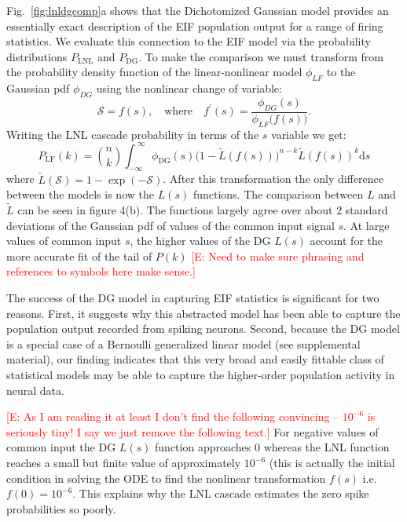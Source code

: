 \documentclass[%
 reprint,
 twocolumn,
 amsmath,amssymb,
 aps,
floatfix,
]{revtex4}
\newcommand{\dd}{\mathrm{d}}
\newcommand{\Ecomment}[1]{\textcolor{red}{[E: #1]}}
\begin{document}
Fig.~\ref{fig:lnldgcomp}a shows that the Dichotomized Gaussian model provides an essentially exact description of the EIF population output for a range of firing statistics.
We evaluate this connection to the EIF model via the probability distributions $P_{\text{LNL}}$ and $P_{\text{DG}}$. To make the comparison we must transform from the probability density function of the linear-nonlinear model $\phi_{LF}$ to the Gaussian pdf $\phi_{DG}$ using the nonlinear change of variable:
\begin{equation}
\mathcal{S} = f(s),\quad\text{where}\quad f^\prime(s) = \frac{\phi_{DG}(s)}{\phi_{LF}\big(f(s)\big)}.
\end{equation}
Writing the LNL cascade probability in terms of the $s$ variable we get:
\begin{equation}
P_{\text{LF}}(k) = \binom{n}{k}\!\!\int_{-\infty}^{~\infty} \phi_{\text{DG}}(s) \big(1-\tilde{L}(f(s))\big)^{n-k} \tilde{L}(f(s))^{k} \dd s
\end{equation}
where $\tilde{L}(\mathcal{S}) = 1-\exp(-\mathcal{S})$. After this transformation the only difference between the models is now the $L(s)$ functions. The comparison between $L$ and $\tilde{L}$ can be seen in figure 4(b). The functions largely agree over about $2$ standard deviations of the Gaussian pdf of values of the common input signal $s$.  At large values of common input $s$, the higher values of the DG $L(s)$ account for the more accurate fit of the tail of $P(k)$ \Ecomment{Need to make sure phrasing and references to symbols here make sense.}  

The success of the DG model in capturing EIF statistics is significant for two reasons.  First, it suggests why this abstracted model has been able to capture the population output recorded from spiking neurons.  Second, because the DG model is a special case of a Bernoulli generalized linear model (see supplemental material), our finding indicates that this very broad and easily fittable class of statistical models may be able to capture the higher-order population activity in neural data.   

\bigskip

\Ecomment{As I am reading it at least I don't find the following convincing -- $10^{-6}$ is seriously tiny!  I say we just remove the following text.} For negative values of common input the DG $L(s)$ function approaches $0$ whereas the LNL function reaches a small but finite value of approximately $10^{-6}$ (this is actually the initial condition in solving the ODE to find the nonlinear transformation $f(s)$ i.e.~$f(0)=10^{-6}$. This explains why the LNL cascade estimates the zero spike probabilities so poorly. \colorbox{BrickRed}{\color{White}{Solving this ODE for $f$ still needs to be checked!}}  
\end{document}
